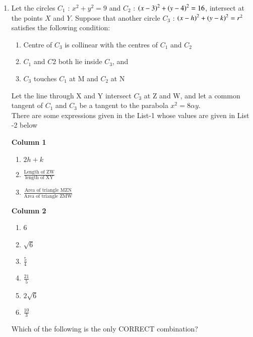 \documentclass[journal,12pt,twocolumn]{IEEEtran}
\theoremstyle{remark}
\begin{document}
\begin{enumerate}
\item Let the circles $C_{1}$ : $x^2+y^2=9$ and $C_{2}$ : $\left(x-3\right)^2+\left(y-4\right)^2 = 16$, intersect at the points $X$ and $Y$. Suppose that another circle $C_{3}$ : $\left(x-h\right)^2+\left(y-k\right)^2=r^2$ satisfies the following condition:\\
 
 
 \begin{enumerate}[label=(\roman*)]
 \item Centre of $C_{3}$ is collinear with the centres of $C_{1}$ and $C_{2}$
 \item $C_{1}$ and $C{2}$ both lie inside $C_{3}$, and

 \item $C_{3}$ touches $C_{1}$ at M and $C_{2}$ at N
\end{enumerate}
Let the line through X and Y intersect $C_{3}$ at Z and W, and let a common tangent of $C_{1}$ and $C_{3}$ be a tangent to the parabola $x^2=8\alpha y.$\\

There are some expressions given in the List-1 whose values are given in List -2 below
		
\begin{multicols}{2}	

\textbf{Column 1}
\begin{enumerate}[label=(\Alph*)]           
\item $2h+k$                                  
\item $\frac{\text{Length of ZW}}{\text{length of XY}}$     
\item $\frac{\text{Area of triangle MZN}}{\text{Area of triangle ZMW}}$                     
\end{enumerate}                              
\columnbreak
 \textbf{Column 2}
 \begin{enumerate}[label=(\alph*) , start=16]
 \item 6
 \item $\sqrt{6}$
 \item $\frac{5}{4}$                           
 \item $\frac{21}{5}$                          
 \item $2\sqrt{6}$                             
 \item $\frac{10}{3}$                         
 \end{enumerate}
 \end{multicols}
 Which of the following is the only CORRECT combination?                                    
\begin{enumerate}[label=(\alph*)]  


\end{enumerate}
\end{enumerate}
\end{document}
